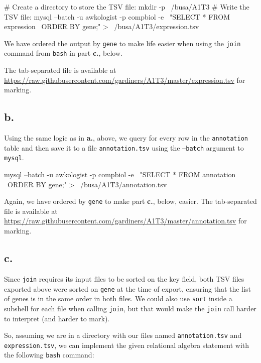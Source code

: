 \documentclass{article}
\begin{document}
\begin{bashcode}
# Create a directory to store the TSV file:
mkdir -p ~/busa/A1T3
# Write the TSV file:
mysql --batch -u awkologist -p compbiol -e \
"SELECT * FROM expression \
ORDER BY gene;" > ~/busa/A1T3/expression.tsv
\end{bashcode}

We have ordered the output by \texttt{gene} to make life easier when using the \texttt{join} command from \texttt{bash} in part \textbf{c.}, below.

The tab-separated file is available at \url{https://raw.githubusercontent.com/gardiners/A1T3/master/expression.tsv} for marking.

\subsection{b.}

Using the same logic as in \textbf{a.}, above, we query for every row in the \texttt{annotation} table and then save it to a file \texttt{annotation.tsv} using the \texttt{--batch} argument to \texttt{mysql}.

\begin{bashcode}
mysql --batch -u awkologist -p compbiol -e \
"SELECT * FROM annotation \
ORDER BY gene;" > ~/busa/A1T3/annotation.tsv
\end{bashcode}

Again, we have ordered by \texttt{gene} to make part \textbf{c.}, below, easier. The tab-separated file is available at \url{https://raw.githubusercontent.com/gardiners/A1T3/master/annotation.tsv} for marking.

\subsection{c.}

Since \texttt{join} requires its input files to be sorted on the key field, both TSV files exported above were sorted on \texttt{gene} at the time of export, ensuring that the list of genes is in the same order in both files. We could also use \texttt{sort} inside a subshell for each file when calling \texttt{join}, but that would make the \texttt{join} call harder to interpret (and harder to mark).

So, assuming we are in a directory with our files named \texttt{annotation.tsv} and \texttt{expression.tsv}, we can implement the given relational algebra statement with the following \texttt{bash} command:
\end{document}
